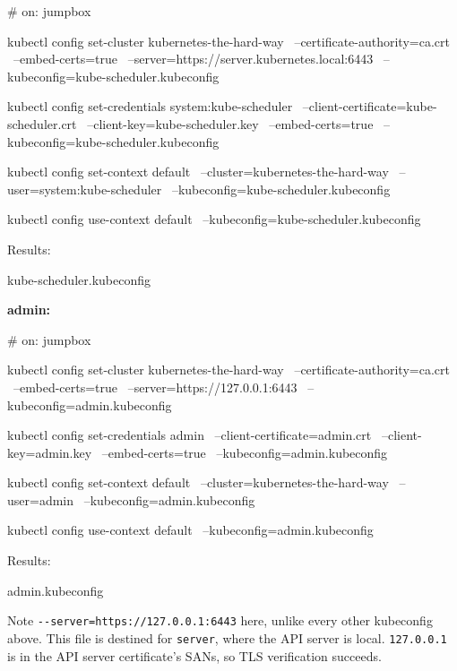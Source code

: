 \documentclass[11pt,oneside]{report}
\begin{document}
\begin{cmdlst}
# on: jumpbox
{
  kubectl config set-cluster kubernetes-the-hard-way \
    --certificate-authority=ca.crt \
    --embed-certs=true \
    --server=https://server.kubernetes.local:6443 \
    --kubeconfig=kube-scheduler.kubeconfig

  kubectl config set-credentials system:kube-scheduler \
    --client-certificate=kube-scheduler.crt \
    --client-key=kube-scheduler.key \
    --embed-certs=true \
    --kubeconfig=kube-scheduler.kubeconfig

  kubectl config set-context default \
    --cluster=kubernetes-the-hard-way \
    --user=system:kube-scheduler \
    --kubeconfig=kube-scheduler.kubeconfig

  kubectl config use-context default \
    --kubeconfig=kube-scheduler.kubeconfig
}
\end{cmdlst}

Results:

\begin{outlst}
kube-scheduler.kubeconfig
\end{outlst}

\textbf{admin:}

\begin{cmdlst}
# on: jumpbox
{
  kubectl config set-cluster kubernetes-the-hard-way \
    --certificate-authority=ca.crt \
    --embed-certs=true \
    --server=https://127.0.0.1:6443 \
    --kubeconfig=admin.kubeconfig

  kubectl config set-credentials admin \
    --client-certificate=admin.crt \
    --client-key=admin.key \
    --embed-certs=true \
    --kubeconfig=admin.kubeconfig

  kubectl config set-context default \
    --cluster=kubernetes-the-hard-way \
    --user=admin \
    --kubeconfig=admin.kubeconfig

  kubectl config use-context default \
    --kubeconfig=admin.kubeconfig
}
\end{cmdlst}

Results:

\begin{outlst}
admin.kubeconfig
\end{outlst}

Note
\texttt{-\/-server=https:}\allowbreak{}\texttt{/}\allowbreak{}\texttt{/}\allowbreak{}\texttt{127.}\allowbreak{}\texttt{0.}\allowbreak{}\texttt{0.}\allowbreak{}\texttt{1:}\allowbreak{}\texttt{6443}
here, unlike every
other kubeconfig
above. This file is
destined for
\texttt{server},
where the API server
is local.
\texttt{127.0.0.1}
is in the API server
certificate's SANs,
so TLS verification
succeeds.
\end{document}
